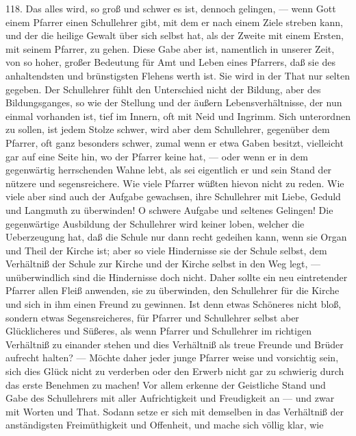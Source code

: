 118. Das alles wird, so groß und schwer es ist, dennoch gelingen, — wenn Gott einem Pfarrer einen Schullehrer gibt, mit dem er nach einem Ziele streben kann, und der die heilige Gewalt über sich selbst hat, als der Zweite mit einem Ersten, mit seinem Pfarrer, zu gehen. Diese Gabe aber ist, namentlich in unserer Zeit, von so hoher, großer Bedeutung für Amt und Leben eines Pfarrers, daß sie des anhaltendsten und brünstigsten Flehens werth ist. Sie wird in der That nur selten gegeben. Der Schullehrer fühlt den Unterschied nicht der Bildung, aber des Bildungsganges, so wie der Stellung und der äußern Lebensverhältnisse, der nun einmal vorhanden ist, tief im Innern, oft mit Neid und Ingrimm. Sich unterordnen zu sollen, ist jedem Stolze schwer, wird aber dem Schullehrer, gegenüber dem Pfarrer, oft ganz besonders schwer, zumal wenn er etwa Gaben besitzt, vielleicht gar
auf eine Seite hin, wo der Pfarrer keine hat, — oder wenn er in dem gegenwärtig herrschenden Wahne lebt, als sei eigentlich er und sein Stand der nützere und segensreichere. Wie viele Pfarrer wüßten hievon nicht zu reden. Wie viele aber sind auch der Aufgabe gewachsen, ihre Schullehrer mit Liebe, Geduld und Langmuth zu überwinden! O schwere Aufgabe und seltenes Gelingen! Die gegenwärtige Ausbildung der Schullehrer wird keiner loben, welcher die Ueberzeugung hat, daß die Schule nur dann recht gedeihen kann, wenn sie Organ und Theil der Kirche ist; aber so viele Hindernisse sie der Schule selbst, dem Verhältniß der Schule zur Kirche und der Kirche selbst in den Weg legt, — unüberwindlich sind die Hindernisse doch nicht. Daher sollte ein neu eintretender Pfarrer allen Fleiß anwenden, sie zu überwinden, den Schullehrer für die Kirche und sich in ihm einen Freund zu gewinnen. Ist denn etwas Schöneres nicht bloß, sondern etwas Segensreicheres, für Pfarrer und Schullehrer selbst aber Glücklicheres und Süßeres, als wenn Pfarrer und Schullehrer im richtigen Verhältniß zu einander stehen und dies Verhältniß als treue Freunde und Brüder aufrecht halten? — Möchte daher jeder junge Pfarrer weise und vorsichtig sein, sich dies Glück nicht zu verderben oder den Erwerb nicht gar zu schwierig durch das erste Benehmen zu machen! Vor allem erkenne der Geistliche Stand und Gabe des Schullehrers mit aller Aufrichtigkeit und Freudigkeit an — und zwar mit Worten und That. Sodann setze er sich mit demselben in das Verhältniß der anständigsten Freimüthigkeit und Offenheit, und mache sich völlig klar, wie

